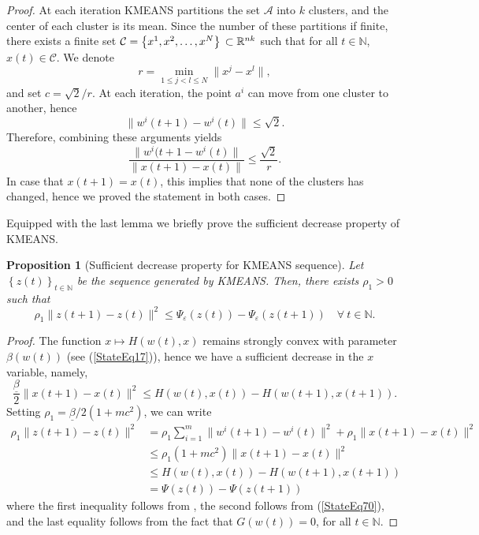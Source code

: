 \documentclass[11pt]{article}
\numberwithin{equation}{section}
\newtheorem{proposition}{Proposition}[section]
\begin{document}
\begin{proof}
At each iteration KMEANS partitions the set $\mathcal{A}$ into $k$ clusters, and the center of each cluster is its mean. Since the number of these partitions if finite, there exists a finite set $\mathcal{C} = \left\lbrace x^1,x^2, \ldots, x^N \right\rbrace\\ \subset \mathbb{R}^{nk}$ such that for all $t \in \mathbb{N}$, $x(t) \in \mathcal{C}$. We denote
\begin{equation*}
	r = \min\limits_{1 \leq j < l \leq N} \|x^j-x^l\|,
\end{equation*}
and set $c = \sqrt{2}/r$.
At each iteration, the point $a^i$ can move from one cluster to another, hence
\begin{equation*}
	\|w^i(t+1)-w^i(t)\| \leq \sqrt{2} .
\end{equation*}
Therefore, combining these arguments yields
\begin{equation*}
	\frac{\|w^i(t+1-w^i(t)\|}{\|x(t+1)-x(t)\|} \leq \frac{\sqrt{2}}{r} .
\end{equation*}
In case that $x(t+1)=x(t)$, this implies that none of the clusters has changed, hence we proved the statement in both cases.
\end{proof}

Equipped with the last lemma we briefly prove the sufficient decrease property of KMEANS.

\begin{proposition}[Sufficient decrease property for KMEANS sequence]
Let $\left\lbrace z(t) \right\rbrace_{t \in \mathbb{N}}$ be the sequence generated by KMEANS. Then, there exists $\rho_1 > 0$ such that 
\begin{equation*}
	\rho_1 \|z(t+1) - z(t)\|^2 \leq \Psi_{\varepsilon}(z(t)) - \Psi_{\varepsilon}(z(t+1)) \quad \forall \: t \in \mathbb{N} .
\end{equation*}
\end{proposition}

\begin{proof}
The function $x \mapsto H(w(t),x)$ remains strongly convex with parameter $\beta(w(t))$ (see (\ref{StateEq17})), hence we have a sufficient decrease in the $x$ variable, namely,
\begin{equation}
	\frac{\underline{\beta}}{2} \|x(t+1)-x(t)\|^2 \leq H(w(t),x(t)) - H(w(t+1),x(t+1)) . \label{StateEq70}
\end{equation}
Setting $\rho_1 = \underline{\beta} /2(1 + mc^2)$, we can write
\begin{align*}
	\rho_1 \|z(t+1)-z(t)\|^2 &= \rho_1 \sum\limits_{i=1}^{m} \|w^i(t+1)-w^i(t)\|^2 + \rho_1 \|x(t+1)-x(t)\|^2 \\
	&\leq \rho_1 (1 + mc^2) \|x(t+1) - x(t)\|^2 \\
	&\leq H(w(t),x(t)) - H(w(t+1),x(t+1)) \\
	&= \Psi(z(t)) - \Psi(z(t+1))
\end{align*}
where the first inequality follows from , the second follows from (\ref{StateEq70}), and the last equality follows from the fact that $G(w(t))=0$, for all $t \in \mathbb{N}$.
\end{proof}
\end{document}
